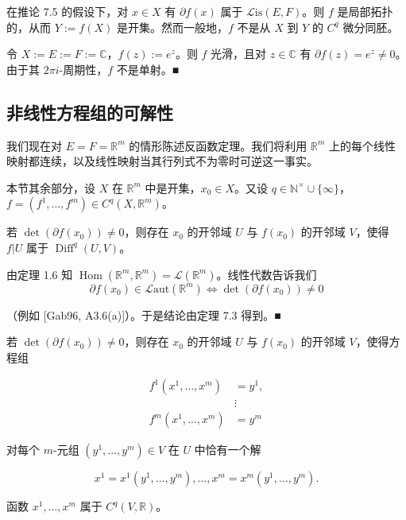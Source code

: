 \begin{remark}

在推论 7.5 的假设下，对 $ x \in X $ 有 $ \partial f(x) $ 属于 $ \mathcal{L}\mathrm{is}(E, F) $。则 $ f $ 是局部拓扑的，从而 $ Y := f(X) $ 是开集。然而一般地，$ f $ 不是从 $ X $ 到 $ Y $ 的 $ C^{q} $ 微分同胚。

\proofhead
令 $ X := E := F := \mathbb{C} $，$ f(z) := e^{z} $。则 $ f $ 光滑，且对 $ z \in \mathbb{C} $ 有 $ \partial f(z) = e^{z} \ne 0 $。由于其 $ 2\pi i $-周期性，$ f $ 不是单射。\nobreak\hspace{0.35em}■
\end{remark}

\subsection*{非线性方程组的可解性}

我们现在对 $ E = F = \mathbb{R}^{m} $ 的情形陈述反函数定理。我们将利用 $ \mathbb{R}^{m} $ 上的每个线性映射都连续，以及线性映射当其行列式不为零时可逆这一事实。

本节其余部分，设 $ X $ 在 $ \mathbb{R}^{m} $ 中是开集，$ x_{0} \in X $。又设 $ q \in \mathbb{N}^{\times} \cup \{\infty\} $，$ f = (f^{1}, \ldots, f^{m}) \in C^{q}(X, \mathbb{R}^{m}) $。

\begin{theorem}

若 $ \det(\partial f(x_{0})) \ne 0 $，则存在 $ x_{0} $ 的开邻域 $ U $ 与 $ f(x_{0}) $ 的开邻域 $ V $，使得 $ f|U $ 属于 $ \operatorname{Diff}^{q}(U, V) $。

\proofhead
由定理 1.6 知 $ \operatorname{Hom}(\mathbb{R}^{m}, \mathbb{R}^{m}) = \mathcal{L}(\mathbb{R}^{m}) $。线性代数告诉我们
\[
\partial f(x_{0}) \in \mathcal{L}\mathrm{aut}(\mathbb{R}^{m}) \iff \det(\partial f(x_{0})) \ne 0
\]

（例如 [Gab96, A3.6(a)]）。于是结论由定理 7.3 得到。\nobreak\hspace{0.35em}■

\end{theorem}

\begin{corollary}

若 $ \det(\partial f(x_{0})) \ne 0 $，则存在 $ x_{0} $ 的开邻域 $ U $ 与 $ f(x_{0}) $ 的开邻域 $ V $，使得方程组

\begin{equation}
\begin{aligned}
f^{1}(x^{1}, \ldots, x^{m}) &= y^{1} , \\ &\vdots \\ f^{m}(x^{1}, \ldots, x^{m}) &= y^{m}
\end{aligned}\tag{7.13}
\end{equation}

对每个 $ m $-元组 $ (y^{1}, \ldots, y^{m}) \in V $ 在 $ U $ 中恰有一个解

\[
x^{1} = x^{1}(y^{1}, \ldots, y^{m}), \ldots, x^{m} = x^{m}(y^{1}, \ldots, y^{m}) .
\]

函数 $ x^{1}, \ldots, x^{m} $ 属于 $ C^{q}(V, \mathbb{R}) $。

\end{corollary}

